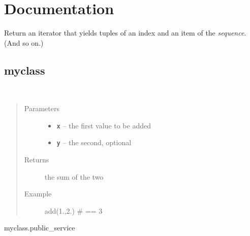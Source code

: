 \documentclass[letterpaper,10pt,english]{sphinxmanual}
\begin{document}
\section{Documentation}
\label{api:documentation}\label{api::doc}

\begin{fulllineitems}
\label{api:enumerate}
Return an iterator that yields tuples of an index and an item of the
\emph{sequence}. (And so on.)

\end{fulllineitems}



\subsection{myclass}
\label{api:myclass}\label{api:module-abc_pack.myclass}

\begin{fulllineitems}
\label{api:abc_pack.myclass.add}~\begin{quote}\begin{description}
\item[{Parameters}] \leavevmode\begin{itemize}
\item {} 
\textbf{\texttt{x}} -- the first value to be added

\item {} 
\textbf{\texttt{y}} -- the second, optional

\end{itemize}

\item[{Returns}] \leavevmode
the sum of the two

\item[{Example}] \leavevmode
add(1.,2.) \# == 3

\end{description}\end{quote}




myclass.public\_service



\end{fulllineitems}
\end{document}
